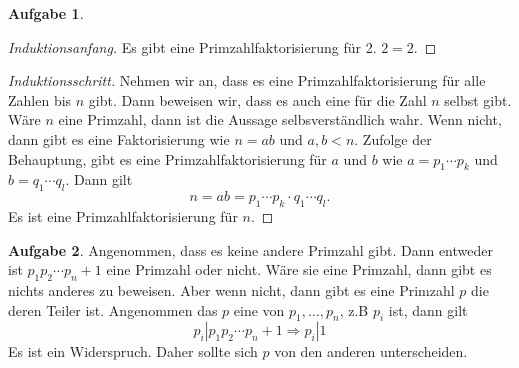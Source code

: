 \documentclass{article}
\theoremstyle{definition}
\newtheorem{ub}{Aufgabe}
\begin{document}
\begin{ub}
	\begin{proof}[Induktionsanfang]
		Es gibt eine Primzahlfaktorisierung f\"ur 2. $ 2 = 2 $.
	\end{proof}
	\begin{proof}[Induktionsschritt]
		Nehmen wir an, dass es eine Primzahlfaktorisierung f\"ur alle Zahlen bis $ n $ gibt. Dann beweisen wir, dass es auch eine f\"ur die Zahl $ n $ selbst gibt. Wäre $ n $ eine Primzahl, dann ist die Aussage selbsverst\"andlich wahr. Wenn nicht, dann gibt es eine Faktorisierung wie $ n = ab $ und 
		$ a,b < n $. Zufolge der Behauptung, gibt es eine Primzahlfaktorisierung f\"ur $ a $ und $ b $ wie
		$ a = p_1 \cdots p_k $ und $ b = q_1 \cdots q_l $. Dann gilt 
		\[ 
		n = ab = p_1\cdots p_k \cdot q_1 \cdots q_l.
		 \] 
		Es ist eine Primzahlfaktorisierung f\"ur $ n $.
	\end{proof}
\end{ub}
\begin{ub}
	Angenommen, dass es keine andere Primzahl gibt. Dann entweder ist $ p_1p_2\cdots p_n +1 $ eine Primzahl oder nicht. W\"are sie eine Primzahl, dann gibt es nichts anderes zu beweisen. Aber wenn nicht, dann gibt es eine Primzahl $ p $ die deren Teiler ist. Angenommen das $ p $ eine von 
	$ p_1 , \ldots, p_n $, z.B $ p_i $ ist, dann gilt
	\[ 
	p_i | p_1p_2\cdots p_n +1 \Rightarrow p_i | 1 
	 \] 
	Es ist ein Widerspruch. Daher sollte sich $ p $ von den anderen unterscheiden.  
\end{ub}
\end{document}
